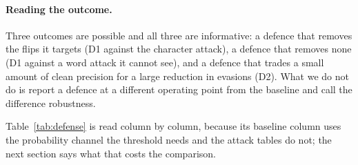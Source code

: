 \paragraph{Reading the outcome.} Three outcomes are possible and all three are
informative: a defence that removes the flips it targets (D1 against the
character attack), a defence that removes none (D1 against a word attack it
cannot see), and a defence that trades a small amount of clean precision for a
large reduction in evasions (D2). What we do not do is report a defence at a
different operating point from the baseline and call the difference robustness.


Table~\ref{tab:defense} is read column by column, because its baseline column
uses the probability channel the threshold needs and the attack tables do not;
the next section says what that costs the comparison.


